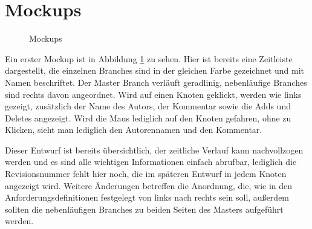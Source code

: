 \documentclass[nocolor]{tudbook}
\begin{document}
\section{Mockups}
\begin{figure}
\caption{Mockups}
\label{fig:mockup1}
\end{figure}

Ein erster Mockup ist in Abbildung \ref{fig:mockup1} zu sehen. Hier ist bereits eine Zeitleiste dargestellt, die einzelnen Branches sind in der gleichen Farbe gezeichnet und mit Namen beschriftet. Der Master Branch verläuft geradlinig, nebenläufige Branches sind rechts davon angeordnet. Wird auf einen Knoten geklickt, werden wie links gezeigt, zusätzlich der Name des Autors, der Kommentar sowie die Adds und Deletes angezeigt. Wird die Maus lediglich auf den Knoten gefahren, ohne zu Klicken, sieht man lediglich den Autorennamen und den Kommentar. 

Dieser Entwurf ist bereits übersichtlich, der zeitliche Verlauf kann nachvollzogen werden und es sind alle wichtigen Informationen einfach abrufbar, lediglich die Revisionsnummer fehlt hier noch, die im späteren Entwurf in jedem Knoten angezeigt wird. Weitere Änderungen betreffen die Anordnung, die, wie in den Anforderungsdefinitionen festgelegt von links nach rechts sein soll, außerdem sollten die nebenläufigen Branches zu beiden Seiten des Masters aufgeführt werden.




\listoffigures
\end{document}
